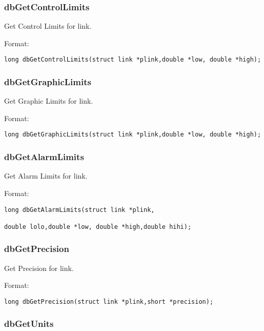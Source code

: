 \subsubsection{dbGetControlLimits}

Get Control Limits for link.

Format:

\begin{verbatim}
long dbGetControlLimits(struct link *plink,double *low, double *high);
\end{verbatim}

\subsubsection{dbGetGraphicLimits}

Get Graphic Limits for link.

Format:

\begin{verbatim}
long dbGetGraphicLimits(struct link *plink,double *low, double *high);
\end{verbatim}

\subsubsection{dbGetAlarmLimits}

Get Alarm Limits for link.

Format:

\begin{verbatim}
long dbGetAlarmLimits(struct link *plink,

double lolo,double *low, double *high,double hihi);
\end{verbatim}

\subsubsection{dbGetPrecision}

Get Precision for link.

Format:

\begin{verbatim}
long dbGetPrecision(struct link *plink,short *precision);
\end{verbatim}

\subsubsection{dbGetUnits}

